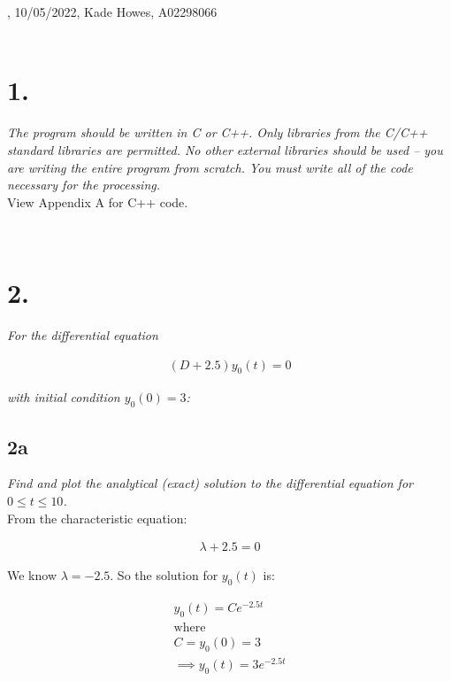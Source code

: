 \documentclass[10pt, AMS Euler]{article}
\begin{document}
, 10/05/2022, Kade Howes, A02298066\\

\noindent \underline{\hspace{7in}}\\
\section*{1.}
\textit{The program should be written in C or C++. Only libraries from the C/C++ standard libraries
are permitted. No other external libraries should be used – you are writing the entire program from
scratch. You must write all of the code necessary for the processing.}\\

View Appendix A for C++ code.

\noindent \underline{\hspace{7in}}\\
\section*{2.}
\textit{For the differential equation}
\begin{center}
    \begin{align*}
        (D + 2.5)y_0(t) = 0
    \end{align*}
\end{center}

\textit{with initial condition $y_0(0) = 3$:}

\subsection*{2a}

\textit{Find and plot the analytical (exact) solution to the differential equation for $0 \le t \le 10$.}\\

From the characteristic equation:
\begin{center}
    \begin{align*}
        \lambda + 2.5 = 0
    \end{align*}
\end{center}

We know $\lambda = -2.5$. So the solution for $y_0(t)$ is: 
\begin{center}
    \begin{align*}
        y_0(t) = Ce^{-2.5t}\\
        \text{where}\\
        C = y_0(0) = 3\\
        \implies y_0(t) = 3e^{-2.5t}
    \end{align*}
\end{center}
\end{document}
